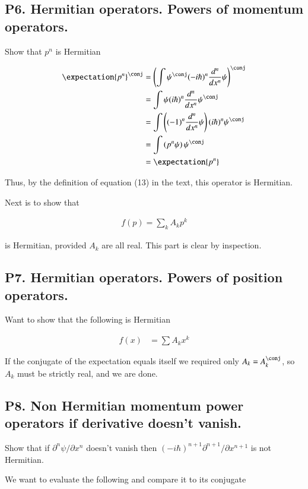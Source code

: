 \subsection{P6. Hermitian operators. Powers of momentum operators. }

Show that $p^n$ is Hermitian

\begin{align*}
\expectation{p^n}^\conj 
&=
\left( \int \psi^\conj (-i \hbar)^n \frac{d^n}{dx^n} \psi \right)^\conj \\
&=
\int \psi (i \hbar)^n \frac{d^n}{dx^n} \psi^\conj \\
&=
\int \left( (-1)^n \frac{d^n}{dx^n} \psi \right) (i \hbar)^n \psi^\conj \\
&=
\int \left( p^n \psi \right) \psi^\conj \\
&=
\expectation{p^n}
\end{align*}

Thus, by the definition of equation (13) in the text, this operator is
Hermitian.

Next is to show that 

\begin{align*}
f(p) = \sum_k A_k p^k
\end{align*}

is Hermitian, provided $A_k$ are all real.  This part is clear by inspection.

\subsection{P7. Hermitian operators. Powers of position operators. }

Want to show that the following is Hermitian

\begin{align*}
f(x) &= \sum A_k x^k
\end{align*}

If the conjugate of the expectation equals itself we required only $A_k = A_k^\conj$, so $A_k$ must be strictly real, and we are done.

\subsection{P8. Non Hermitian momentum power operators if derivative doesn't vanish. }

Show that if $\partial^n \psi/\partial x^n$ doesn't vanish then $(-i\hbar)^{n+1} \partial^{n+1}/\partial x^{n+1}$ is not Hermitian.

We want to evaluate the following and compare it to its conjugate

